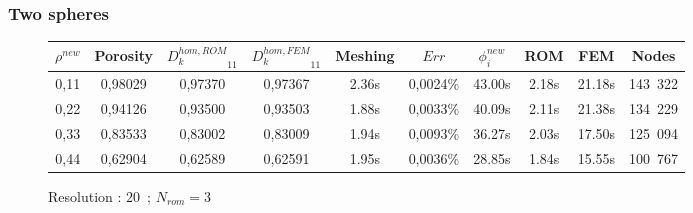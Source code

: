 {%
\subsubsection{Two spheres}

\begin{comment}
\begin{figure}[H]
\begin{center}
\begin{tabular}{|c|c|}
\hline
\texttt{[image: ../Figures3D/ener\_vp\_2sph\_ray\_res10.png]}
&%
\texttt{[image: ../Figures3D/ener\_cumul\_vp\_2sph\_ray\_res10.png]}
\\ \hline
\end{tabular}
\end{center}
\caption{Energy of POD modes}
\end{figure}
\end{comment}

\begin{comment}
\begin{figure}[H]%
%
\begin{center}
\begin{tabular}{|c|c||c|c||c|c||c|c||c||c|}
\hline
\rowcolor{lightgray} $\rho^{new}$&Porosity&${D_k^{hom,ROM}}_{11}$&${D_k^{hom,FEM}}_{11}$&Meshing&$Err$&$\phi_i^{new}$&ROM&FEM&Nodes\\
\hline
0,11&0,&0,&0,&s&0,\%&s&s&s&\\
\hline
0,22&0,&0,&0,&s&0,\%&s&s&s&\\
\hline
0,33&0,&0,&0,&s&0,\%&s&s&s&\\
\hline
0,44&0,&0,&0,&s&0,\%&s&s&s&\\
\hline
\end{tabular}
\end{center}
\caption{Resolution : $10$\ ; $N_{rom}=4$}
%
\end{figure}
\end{comment}

\begin{figure}[H]%
%
\begin{center}
\begin{tabular}{|c|c||c|c||c|c||c|c||c||c|}
\hline
\rowcolor{lightgray} $\rho^{new}$&Porosity&${D_k^{hom,ROM}}_{11}$&${D_k^{hom,FEM}}_{11}$&Meshing&$Err$&$\phi_i^{new}$&ROM&FEM&Nodes\\
\hline
0,11&0,98029&0,97370&0,97367&2.36s&0,0024\%&43.00s&2.18s&21.18s&143\ 322\\
\hline
0,22&0,94126&0,93500&0,93503&1.88s&0,0033\%&40.09s&2.11s&21.38s&134\ 229\\
\hline
0,33&0,83533&0,83002&0,83009&1.94s&0,0093\%&36.27s&2.03s&17.50s&125\ 094\\
\hline
0,44&0,62904&0,62589&0,62591&1.95s&0,0036\%&28.85s&1.84s&15.55s&100\ 767\\
\hline
\end{tabular}
\end{center}
\caption{Resolution : $20$\ ; $N_{rom}=3$}
%
\end{figure}

}
